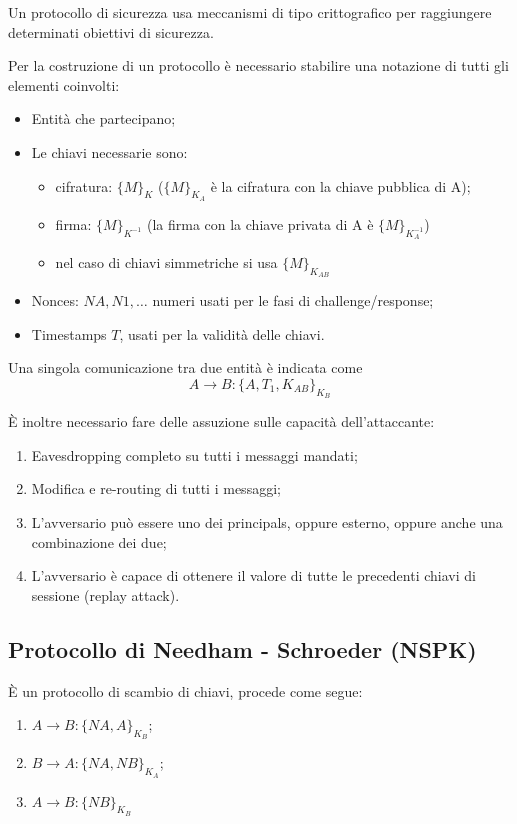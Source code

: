 \documentclass[a4paper, 11pt, twoside]{article}
\begin{document}
	Un protocollo di sicurezza usa meccanismi di tipo crittografico per raggiungere determinati obiettivi di sicurezza.
	
	Per la costruzione di un protocollo è necessario stabilire una notazione di tutti gli elementi coinvolti:
	\begin{itemize}
		\item Entità che partecipano;
		\item Le chiavi necessarie sono:
			\begin{itemize}
				\item cifratura: $\lbrace M\rbrace_K$ ($\lbrace M\rbrace_{K_A}$ è la cifratura con la chiave pubblica di A);
				\item firma: $\lbrace M\rbrace_{K^{-1}}$ (la firma con la chiave privata di A è $\lbrace M\rbrace_{K_A^{-1}}$)
				\item nel caso di chiavi simmetriche si usa $\lbrace M\rbrace_{K_{AB}}$
			\end{itemize}
		\item Nonces: $NA, N1, \dots$ numeri usati per le fasi di challenge/response;
		\item Timestamps $T$, usati per la validità delle chiavi.
	\end{itemize}

	Una singola comunicazione tra due entità è indicata come \[ A \to B : \lbrace A, T_1, K_{AB}\rbrace_{K_B} \]

	È inoltre necessario fare delle assuzione sulle capacità dell'attaccante:
	\begin{enumerate}
		\item Eavesdropping completo su tutti i messaggi mandati;
		\item Modifica e re-routing di tutti i messaggi;
		\item L'avversario può essere uno dei principals, oppure esterno, oppure anche una combinazione dei due;
		\item L'avversario è capace di ottenere il valore di tutte le precedenti chiavi di sessione (replay attack).
	\end{enumerate}

	\subsection{Protocollo di Needham - Schroeder (NSPK)}
	È un protocollo di scambio di chiavi, procede come segue:
	\begin{enumerate}
		\item $A \to B: \lbrace NA, A\rbrace_{K_B}$;
		\item $B \to A: \lbrace NA, NB\rbrace_{K_A}$;
		\item $A \to B: \lbrace NB\rbrace_{K_B}$
	\end{enumerate}
\end{document}
